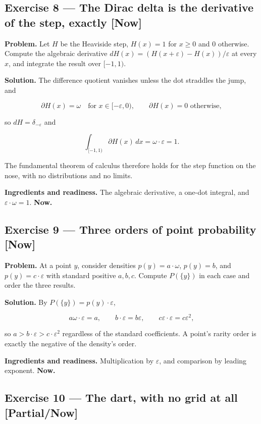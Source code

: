 \documentclass[11pt]{article}
\newcommand{\eps}{\varepsilon}
\renewcommand{\epsilon}{\varepsilon}
\begin{document}
\subsection*{Exercise 8 --- The Dirac delta is the derivative of the step, exactly \hfill \normalfont\small[Now]}

\textbf{Problem.} Let $H$ be the Heaviside step, $H(x) = 1$ for $x \ge  0$ and $0$
otherwise. Compute the algebraic derivative $dH(x) = (H(x+\eps)-H(x))/\eps$
at every $x$, and integrate the result over $[-1,1)$.

\textbf{Solution.} The difference quotient vanishes unless the dot straddles the
jump, and

\[
\partial H(x)=\omega \quad\text{for } x\in[-\epsilon,0),
\qquad \partial H(x)=0 \text{ otherwise},
\]

so $dH = \delta_{-\eps}$ and

\[
\int_{[-1,1)}\partial H(x)\,dx=\omega\cdot\epsilon=1 .
\]

The fundamental theorem of calculus therefore holds for the step function on
the nose, with no distributions and no limits.

\textbf{Ingredients and readiness.} The algebraic derivative, a one-dot integral,
and $\eps\cdot \omega = 1$. \textbf{Now.}


\subsection*{Exercise 9 --- Three orders of point probability \hfill \normalfont\small[Now]}

\textbf{Problem.} At a point $y$, consider densities $p(y) = a\cdot \omega$, $p(y) = b$,
and $p(y) = c\cdot \eps$ with standard positive $a,b,c$. Compute $P(\{y\})$ in
each case and order the three results.

\textbf{Solution.} By $P(\{y\}) = p(y)\cdot \eps$,

\[
a\omega\cdot\epsilon=a,
\qquad
b\cdot\epsilon=b\epsilon,
\qquad
c\epsilon\cdot\epsilon=c\epsilon^{2},
\]

so $a > b\cdot \eps > c\cdot \eps^2$ regardless of the standard coefficients. A
point's rarity order is exactly the negative of the density's order.

\textbf{Ingredients and readiness.} Multiplication by $\eps$, and comparison by
leading exponent. \textbf{Now.}


\subsection*{Exercise 10 --- The dart, with no grid at all \hfill \normalfont\small[Partial/Now]}
\end{document}

